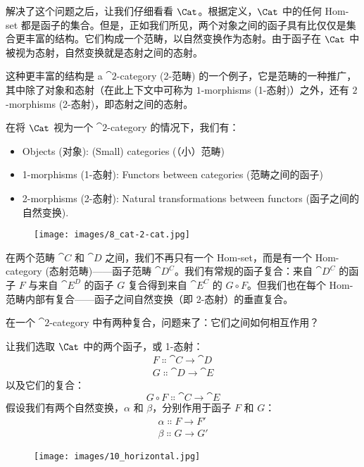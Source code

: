 解决了这个问题之后，让我们仔细看看 $\Cat$。根据定义，$\Cat$ 中的任何 Hom-set 都是函子的集合。但是，正如我们所见，两个对象之间的函子具有比仅仅是集合更丰富的结构。它们构成一个范畴，以自然变换作为态射。由于函子在 $\Cat$ 中被视为态射，自然变换就是态射之间的态射。

这种更丰富的结构是 a $\cat{2}{}$-category (2-范畴) 的一个例子，它是范畴的一种推广，其中除了对象和态射（在此上下文中可称为 $1$-morphisms (1-态射)）之外，还有 $2$-morphisms (2-态射)，即态射之间的态射。

在将 $\Cat$ 视为一个 $\cat{2}{}$-category 的情况下，我们有：

\begin{itemize}
  \tightlist
  \item
        Objects (对象): (Small) categories (（小）范畴)
  \item
        1-morphisms (1-态射): Functors between categories (范畴之间的函子)
  \item
        2-morphisms (2-态射): Natural transformations between functors (函子之间的自然变换).
\end{itemize}

\begin{figure}[H]
  \centering
  \texttt{[image: images/8\_cat-2-cat.jpg]}
\end{figure}

\noindent
在两个范畴 $\cat{C}$ 和 $\cat{D}$ 之间，我们不再只有一个 Hom-set，而是有一个 Hom-category (态射范畴)——函子范畴 $\cat{D^C}$。我们有常规的函子复合：来自 $\cat{D^C}$ 的函子 $F$ 与来自 $\cat{E^D}$ 的函子 $G$ 复合得到来自 $\cat{E^C}$ 的 $G \circ F$。但我们也在每个 Hom-范畴内部有复合——函子之间自然变换（即 2-态射）的垂直复合。

在一个 $\cat{2}{}$-category 中有两种复合，问题来了：它们之间如何相互作用？

让我们选取 $\Cat$ 中的两个函子，或 1-态射：
\begin{gather*}
  F \Colon \cat{C} \to \cat{D} \\
  G \Colon \cat{D} \to \cat{E}
\end{gather*}
以及它们的复合：
\[G \circ F \Colon \cat{C} \to \cat{E}\]
假设我们有两个自然变换，$\alpha$ 和 $\beta$，分别作用于函子 $F$ 和 $G$：
\begin{gather*}
  \alpha \Colon F \to F' \\
  \beta \Colon G \to G'
\end{gather*}

\begin{figure}[H]
  \centering
  \texttt{[image: images/10\_horizontal.jpg]}
\end{figure}

